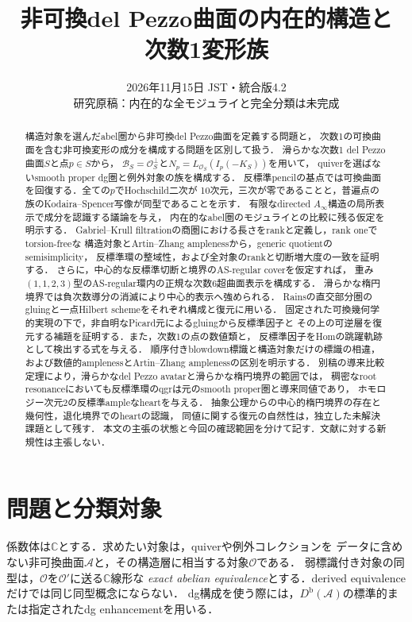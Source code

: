 \documentclass[11pt,a4paper]{ltjsarticle}
\title{非可換del Pezzo曲面の内在的構造と\\次数1変形族}
\author{}
\date{2026年11月15日 JST・統合版4.2\\研究原稿：内在的な全モジュライと完全分類は未完成}
\theoremstyle{definition}
\newcommand{\OO}{\mathcal O}
\renewcommand{\AA}{\mathcal A}
\newcommand{\BB}{\mathcal B}
\newcommand{\Db}{D^{\mathrm b}}
\begin{document}
\maketitle
\begin{abstract}
構造対象を選んだabel圏から非可換del Pezzo曲面を定義する問題と，
次数1の可換曲面を含む非可換変形の成分を構成する問題を区別して扱う．
滑らかな次数1 del Pezzo曲面$S$と点$p\in S$から，
$\BB_S=\OO_S^\perp$と$N_p=L_{\OO_S}(I_p(-K_S))$を用いて，
quiverを選ばないsmooth proper dg圏と例外対象の族を構成する．
反標準pencilの基点では可換曲面を回復する．全ての$p$でHochschild二次が
10次元，三次が零であることと，普遍点の族のKodaira--Spencer写像が同型であることを示す．
有限なdirected $A_\infty$構造の局所表示で成分を認識する議論を与え，
内在的なabel圏のモジュライとの比較に残る仮定を明示する．
Gabriel--Krull filtrationの商圏における長さをrankと定義し，rank oneでtorsion-freeな
構造対象とArtin--Zhang amplenessから，generic quotientのsemisimplicity，
反標準環の整域性，および全対象のrankと切断増大度の一致を証明する．
さらに，中心的な反標準切断と境界のAS-regular coverを仮定すれば，
重み$(1,1,2,3)$型のAS-regular環内の正規な次数6超曲面表示を構成する．
滑らかな楕円境界では負次数導分の消滅により中心的表示へ強められる．
Rainsの直交部分圏のgluingと一点Hilbert schemeをそれぞれ構成と復元に用いる．
固定された可換幾何学的実現の下で，非自明なPicard元によるgluingから反標準因子と
その上の可逆層を復元する補題を証明する．また，次数1の点の数値類と，
反標準因子をHomの跳躍軌跡として検出する式を与える．
順序付きblowdown標識と構造対象だけの標識の相違，
および数値的amplenessとArtin--Zhang amplenessの区別を明示する．
別稿の導来比較定理により，滑らかなdel Pezzo avatarと滑らかな楕円境界の範囲では，
稠密なroot resonanceにおいても反標準環のqgrは元のsmooth proper圏と導来同値であり，
ホモロジー次元2の反標準ampleなheartを与える．
抽象公理からの中心的楕円境界の存在と幾何性，退化境界でのheartの認識，
同値に関する復元の自然性は，独立した未解決課題として残す．
本文の主張の状態と今回の確認範囲を分けて記す．文献に対する新規性は主張しない．
\end{abstract}

\section{問題と分類対象}
係数体は$\mathbb C$とする．求めたい対象は，quiverや例外コレクションを
データに含めない非可換曲面$\AA$と，その構造層に相当する対象$\OO$である．
弱標識付き対象の同型は，$\OO$を$\OO'$に送る$\mathbb C$線形な
\emph{exact abelian equivalence}とする．derived equivalenceだけでは同じ同型概念にならない．
dg構成を使う際には，$\Db(\AA)$の標準的または指定されたdg enhancementを用いる．
\end{document}
